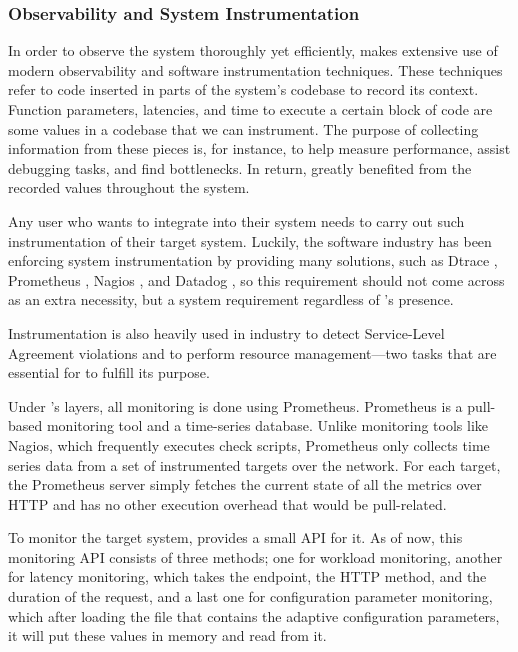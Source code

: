 \subsubsection{Observability and System Instrumentation}

In order to observe the system thoroughly yet efficiently, \projectname{} makes extensive use of modern observability and software instrumentation techniques. These techniques refer to code inserted in parts of the system's codebase to record its context. Function parameters, latencies, and time to execute a certain block of code are some values in a codebase that we can instrument. The purpose of collecting information from these pieces is, for instance, to help measure performance, assist debugging tasks, and find bottlenecks. In return, \projectname{} greatly benefited from the recorded values throughout the system.

Any user who wants to integrate \projectname{} into their system needs to carry out such instrumentation of their target system. Luckily, the software industry has been enforcing system instrumentation by providing many solutions, such as Dtrace \cite{cantrill_dynamic_2004}, Prometheus \cite{Prometheus}, Nagios \cite{Nagios}, and Datadog \cite{Datadog}, so this requirement should not come across as an extra necessity, but a system requirement regardless of \projectname{}'s presence.

Instrumentation is also heavily used in industry  to detect Service-Level Agreement violations and to perform resource management---two tasks that are essential for \projectname{} to fulfill its purpose.

Under \projectname{}'s layers, all monitoring is done using Prometheus. Prometheus is a pull-based monitoring tool and a time-series database. Unlike monitoring tools like Nagios, which frequently executes check scripts, Prometheus only collects time series data from a set of instrumented targets over the network. For each target, the Prometheus server simply fetches the current state of all the metrics over HTTP and has no other execution overhead that would be pull-related.

To monitor the target system, \projectname{} provides a small API for it. As of now, this monitoring API consists of three methods; one for workload monitoring, another for latency monitoring, which takes the endpoint, the HTTP method, and the duration of the request, and a last one for configuration parameter monitoring, which after loading the file that contains the adaptive configuration parameters, it will put these values in memory and read from it.

